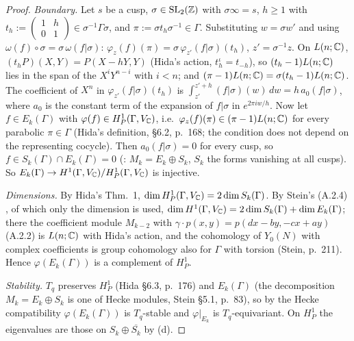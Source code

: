 \begin{proof}
\emph{Boundary.} Let $s$ be a cusp, $\sigma\in\mathrm{SL}_2(\mathbb{Z})$ with $\sigma\infty=s$, $h\ge1$ with $t_h:=\left(\begin{smallmatrix}1&h\\0&1\end{smallmatrix}\right)\in\sigma^{-1}\Gamma\sigma$, and
$\pi:=\sigma t_h\sigma^{-1}\in\Gamma$. Substituting $w=\sigma w'$ and using $\omega(f)\circ\sigma=\sigma\,\omega(f|\sigma)$:
$\varphi_z(f)(\pi)=\sigma\,\varphi_{z'}(f|\sigma)(t_h)$, $z'=\sigma^{-1}z$. On $L(n;\mathbb{C})$, $(t_hP)(X,Y)=P(X-hY,Y)$ (Hida's action, $t_h^\iota=t_{-h}$), so
$(t_h-1)L(n;\mathbb{C})$ lies in the span of the $X^iY^{n-i}$ with $i<n$; and $(\pi-1)L(n;\mathbb{C})=\sigma(t_h-1)L(n;\mathbb{C})$. The coefficient of $X^n$ in
$\varphi_{z'}(f|\sigma)(t_h)$ is $\int_{z'}^{z'+h}(f|\sigma)(w)\,dw=h\,a_0(f|\sigma)$, where $a_0$ is the constant term of the expansion of $f|\sigma$ in
$e^{2\pi iw/h}$. Now let $f\in E_k(\Gamma)$ with $\varphi(f)\in H^1_P(\Gamma,V_{\mathbb{C}})$, i.e.\ $\varphi_z(f)(\pi)\in(\pi-1)L(n;\mathbb{C})$ for every parabolic $\pi\in\Gamma$ (Hida's
definition, \S6.2, p.~168; the condition does not depend on the representing cocycle). Then $a_0(f|\sigma)=0$ for every cusp, so $f\in S_k(\Gamma)\cap E_k(\Gamma)=0$
(: $M_k=E_k\oplus S_k$, $S_k$ the forms vanishing at all cusps). So
$E_k(\Gamma)\to H^1(\Gamma,V_{\mathbb{C}})/H^1_P(\Gamma,V_{\mathbb{C}})$ is injective.

\emph{Dimensions.} By Hida's Thm.~1, $\dim H^1_P(\Gamma,V_{\mathbb{C}})=2\dim S_k(\Gamma)$. By Stein's (A.2.4)
, of which only the dimension is used, $\dim H^1(\Gamma,V_{\mathbb{C}})=2\dim S_k(\Gamma)+\dim E_k(\Gamma)$; there
the coefficient module $M_{k-2}$ with $\gamma\cdot p(x,y)=p(dx-by,-cx+ay)$ (A.2.2) is $L(n;\mathbb{C})$ with Hida's action, and the cohomology of $Y_0(N)$ with complex coefficients is
group cohomology also for $\Gamma$ with torsion (Stein, p.~211). Hence $\varphi(E_k(\Gamma))$ is a complement of $H^1_P$.

\emph{Stability.} $T_q$ preserves $H^1_P$ (Hida \S6.3, p.~176) and $E_k(\Gamma)$ (the decomposition $M_k=E_k\oplus S_k$ is one of Hecke modules, Stein \S5.1, p.~83), so by the
Hecke compatibility $\varphi(E_k(\Gamma))$ is $T_q$-stable and $\varphi|_{E_k}$ is $T_q$-equivariant. On $H^1_P$ the eigenvalues are those on $S_k\oplus\overline{S_k}$ by (d).
\end{proof}

